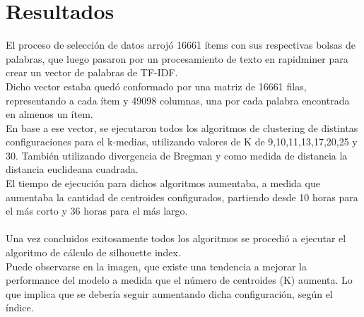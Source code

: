\section{Resultados}

El proceso de selección de datos arrojó 16661 ítems con sus respectivas bolsas de palabras, que luego pasaron por un procesamiento de texto 
en rapidminer para crear un vector de palabras de TF-IDF.\\
Dicho vector estaba quedó conformado por una matriz de 16661 filas, representando a cada ítem y 49098 columnas, una por cada palabra encontrada 
en almenos un ítem.\\
En base a ese vector, se ejecutaron todos los algoritmos de clustering de distintas configuraciones para el k-medias, utilizando valores de K de 9,10,11,13,17,20,25 y 30. 
También utilizando divergencia de Bregman y como medida de distancia la distancia euclideana cuadrada.\\
El tiempo de ejecución para dichos algoritmos aumentaba, a medida que aumentaba la cantidad de centroides configurados, partiendo desde 10 horas para 
el más corto y 36 horas para el más largo.\\
\\
Una vez concluidos exitosamente todos los algoritmos se procedió a ejecutar el algoritmo de cálculo de silhouette index.\\
Puede observarse en la imagen, que existe una tendencia a mejorar la performance del modelo a medida que el número de centroides 
(K) aumenta. Lo que implica que se debería seguir aumentando dicha configuración, según el índice.


